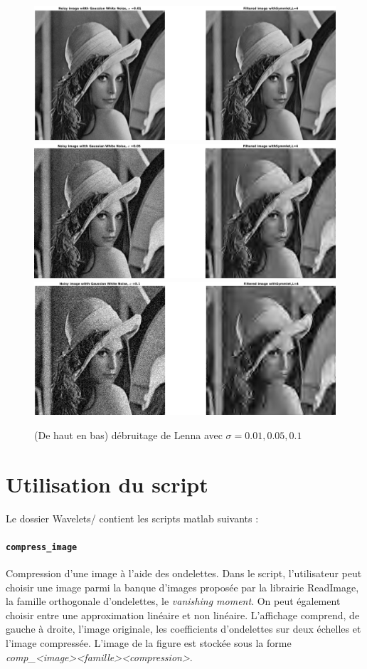 \documentclass[a4paper,12pt, openany, twoside]{article}
\theoremstyle{break}
\begin{document}
\begin{figure}[!htpb]
  \centering
  \includegraphics[width=\textwidth]{denoise_lenna1}\vfill
  \includegraphics[width=\textwidth]{denoise_lenna5}\vfill
  \includegraphics[width=\textwidth]{denoise_lenna10}\vfill
  \caption{(De haut en bas) débruitage de Lenna avec $\sigma=0.01, 0.05, 0.1$}
\end{figure}
\clearpage

\section{Utilisation du script}
Le dossier Wavelets/ contient les scripts matlab suivants :


\paragraph{\texttt{compress\_image}}
Compression d'une image à l'aide des ondelettes. Dans le script, l'utilisateur peut choisir une image parmi la banque d'images proposée par la librairie ReadImage, la famille orthogonale d'ondelettes, le \textit{vanishing moment}. On peut également choisir entre une approximation linéaire et non linéaire. L'affichage comprend, de gauche à droite, l'image originale, les coefficients d'ondelettes sur deux échelles et l'image compressée. L'image de la figure est stockée sous la forme  \textit{comp\_<image><famille><compression>}.
\end{document}
